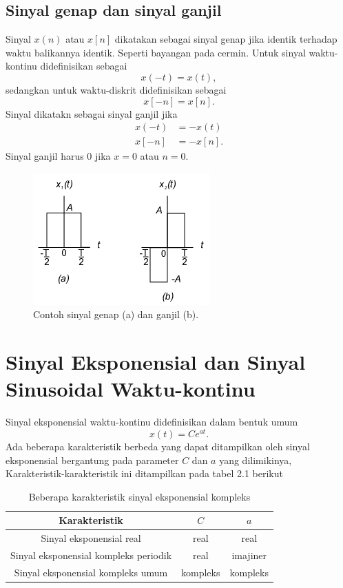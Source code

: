 \subsection{Sinyal genap dan sinyal ganjil}
Sinyal $x(n)$ atau $x[n]$ dikatakan sebagai sinyal genap jika identik terhadap waktu balikannya identik. Seperti bayangan pada cermin. Untuk sinyal waktu-kontinu didefinisikan sebagai
\begin{equation}
x(-t) = x(t),
\end{equation}
sedangkan untuk waktu-diskrit didefinisikan sebagai
\begin{equation}
x[-n]=x[n].
\end{equation}
Sinyal dikatakn sebagai sinyal ganjil jika
\begin{align}
x(-t) &= -x(t)\\
x[-n] &= -x[n].
\end{align}  
Sinyal ganjil harus 0 jika $x=0$ atau $n=0$.
\begin{figure}
\centering
\includegraphics[scale=0.9]{pict/genapganjil}
\caption{Contoh sinyal genap (a) dan ganjil (b).}
\end{figure} 

\section{Sinyal Eksponensial dan Sinyal Sinusoidal Waktu-kontinu}
Sinyal eksponensial waktu-kontinu didefinisikan dalam bentuk umum
\begin{equation}
x(t)=Ce^{at}.
\end{equation}
Ada beberapa karakteristik berbeda yang dapat ditampilkan oleh sinyal eksponensial bergantung pada parameter $C$ dan $a$ yang dilimikinya, Karakteristik-karakteristik ini ditampilkan pada tabel 2.1 berikut

\begin{table}
\centering
\caption{Beberapa karakteristik sinyal eksponensial kompleks}
\begin{tabular}{|c|c|c|}
\hline
\textbf{Karakteristik} & $C$ & $a$\\
\hline
\hline
Sinyal eksponensial real & real & real\\
\hline
Sinyal eksponensial kompleks periodik & real & imajiner\\
\hline
Sinyal eksponensial kompleks umum & kompleks & kompleks\\
\hline
\end{tabular}
\end{table}

